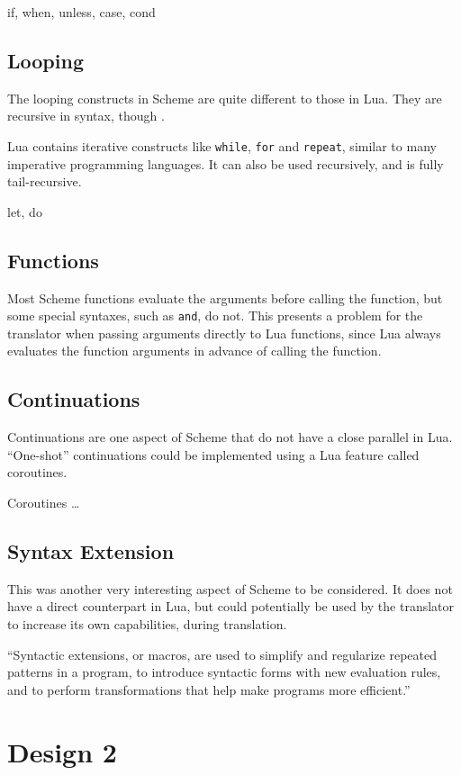 if, when, unless, case, cond

\subsection{Looping}

The looping constructs in Scheme are quite different to those in Lua. They are
recursive in syntax, though .

Lua contains iterative constructs like \texttt{while}, \texttt{for} and
\texttt{repeat}, similar to many imperative programming languages. It can also
be used recursively, and is fully tail-recursive.

let, do

\subsection{Functions}

Most Scheme functions evaluate the arguments before calling the function, but
some special syntaxes, such as \texttt{and}, do not. This presents a problem
for the translator when passing arguments directly to Lua functions, since Lua
always evaluates the function arguments in advance of calling the function.


\subsection{Continuations}

Continuations are one aspect of Scheme that do not have a close parallel in
Lua. ``One-shot'' continuations could be implemented using a Lua feature called
coroutines.

Coroutines \ldots

\subsection{Syntax Extension}

This was another very interesting aspect of Scheme to be considered. It does not
have a direct counterpart in Lua, but could potentially be used by the
translator to increase its own capabilities, during translation.

``Syntactic extensions, or macros, are used to simplify and regularize repeated
patterns in a program, to introduce syntactic forms with new evaluation rules,
and to perform transformations that help make programs more
efficient.''~\cite[Ch~8]{tspl}


\section{Design 2}

